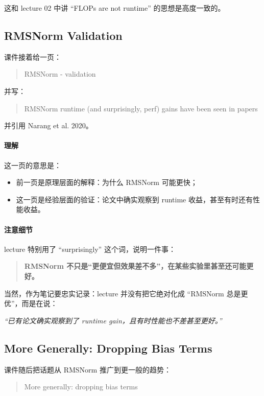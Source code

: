 \documentclass[a4paper,UTF8]{article}
\numberwithin{equation}{section}
\begin{document}
这和 lecture 02 中讲 ``FLOPs are not runtime'' 的思想是高度一致的。

\subsection{RMSNorm Validation}

课件接着给一页：
\begin{quote}
RMSNorm - validation
\end{quote}

并写：
\begin{quote}
RMSNorm runtime (and surprisingly, perf) gains have been seen in papers
\end{quote}

并引用 Narang et al. 2020。

\paragraph{理解}
这一页的意思是：

\begin{itemize}
    \item 前一页是原理层面的解释：为什么 RMSNorm 可能更快；
    \item 这一页是经验层面的验证：论文中确实观察到 runtime 收益，甚至有时还有性能收益。
\end{itemize}

\paragraph{注意细节}
lecture 特别用了 ``surprisingly'' 这个词，说明一件事：

\begin{quote}
\textbf{RMSNorm 不只是“更便宜但效果差不多”，在某些实验里甚至还可能更好。}
\end{quote}

当然，作为笔记要忠实记录：lecture 并没有把它绝对化成 ``RMSNorm 总是更优''，而是在说：
\begin{center}
\emph{“已有论文确实观察到了 runtime gain，且有时性能也不差甚至更好。”}
\end{center}

\subsection{More Generally: Dropping Bias Terms}

课件随后把话题从 RMSNorm 推广到更一般的趋势：
\begin{quote}
More generally: dropping bias terms
\end{quote}
\end{document}
